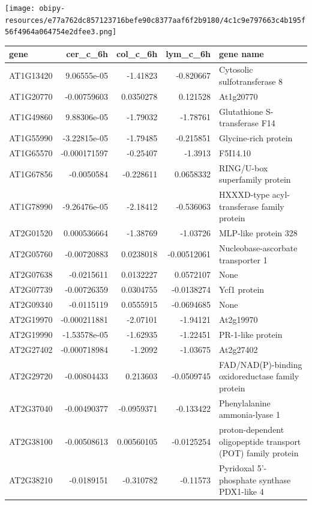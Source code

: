 \documentclass[11pt]{article}
\begin{document}
\begin{center}
\texttt{[image: obipy-resources/e77a762dc857123716befe90c8377aaf6f2b9180/4c1c9e797663c4b195f56f4964a064754e2dfee3.png]}
\end{center}


\begin{center}
\begin{tabular}{lrrrl}
gene & cer\_c\_6h & col\_c\_6h & lym\_c\_6h & gene name\\
\hline
AT1G13420 & 9.06555e-05 & -1.41823 & -0.820667 & Cytosolic sulfotransferase 8\\
AT1G20770 & -0.00759603 & 0.0350278 & 0.121528 & At1g20770\\
AT1G49860 & 9.88306e-05 & -1.79032 & -1.78761 & Glutathione S-transferase F14\\
AT1G55990 & -3.22815e-05 & -1.79485 & -0.215851 & Glycine-rich protein\\
AT1G65570 & -0.000171597 & -0.25407 & -1.3913 & F5I14.10\\
AT1G67856 & -0.0050584 & -0.228611 & 0.0658332 & RING/U-box superfamily protein\\
AT1G78990 & -9.26476e-05 & -2.18412 & -0.536063 & HXXXD-type acyl-transferase family protein\\
AT2G01520 & 0.000536664 & -1.38769 & -1.03726 & MLP-like protein 328\\
AT2G05760 & -0.00720883 & 0.0238018 & -0.00512061 & Nucleobase-ascorbate transporter 1\\
AT2G07638 & -0.0215611 & 0.0132227 & 0.0572107 & None\\
AT2G07739 & -0.00726359 & 0.0304755 & -0.0138274 & Ycf1 protein\\
AT2G09340 & -0.0115119 & 0.0555915 & -0.0694685 & None\\
AT2G19970 & -0.000211881 & -2.07101 & -1.94121 & At2g19970\\
AT2G19990 & -1.53578e-05 & -1.62935 & -1.22451 & PR-1-like protein\\
AT2G27402 & -0.000718984 & -1.2092 & -1.03675 & At2g27402\\
AT2G29720 & -0.00804433 & 0.213603 & -0.0509745 & FAD/NAD(P)-binding oxidoreductase family protein\\
AT2G37040 & -0.00490377 & -0.0959371 & -0.133422 & Phenylalanine ammonia-lyase 1\\
AT2G38100 & -0.00508613 & 0.00560105 & -0.0125254 & proton-dependent oligopeptide transport (POT) family protein\\
AT2G38210 & -0.0189151 & -0.310782 & -0.11573 & Pyridoxal 5'-phosphate synthase PDX1-like 4\\

\end{tabular}
\end{center}
\end{document}
